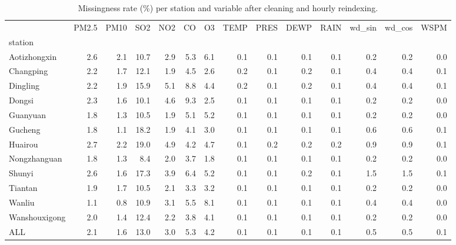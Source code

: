 \begin{table}
\caption{Missingness rate (\%) per station and variable after cleaning and hourly reindexing.}
\label{tab:missingness_station_variable}
\begin{tabular}{lrrrrrrrrrrrrr}
\toprule
 & PM2.5 & PM10 & SO2 & NO2 & CO & O3 & TEMP & PRES & DEWP & RAIN & wd\_sin & wd\_cos & WSPM \\
station &  &  &  &  &  &  &  &  &  &  &  &  &  \\
\midrule
Aotizhongxin & 2.6 & 2.1 & 10.7 & 2.9 & 5.3 & 6.1 & 0.1 & 0.1 & 0.1 & 0.1 & 0.2 & 0.2 & 0.0 \\
Changping & 2.2 & 1.7 & 12.1 & 1.9 & 4.5 & 2.6 & 0.2 & 0.1 & 0.2 & 0.1 & 0.4 & 0.4 & 0.1 \\
Dingling & 2.2 & 1.9 & 15.9 & 5.1 & 8.8 & 4.4 & 0.2 & 0.1 & 0.2 & 0.1 & 0.4 & 0.4 & 0.1 \\
Dongsi & 2.3 & 1.6 & 10.1 & 4.6 & 9.3 & 2.5 & 0.1 & 0.1 & 0.1 & 0.1 & 0.2 & 0.2 & 0.0 \\
Guanyuan & 1.8 & 1.3 & 10.5 & 1.9 & 5.1 & 5.2 & 0.1 & 0.1 & 0.1 & 0.1 & 0.2 & 0.2 & 0.0 \\
Gucheng & 1.8 & 1.1 & 18.2 & 1.9 & 4.1 & 3.0 & 0.1 & 0.1 & 0.1 & 0.1 & 0.6 & 0.6 & 0.1 \\
Huairou & 2.7 & 2.2 & 19.0 & 4.9 & 4.2 & 4.7 & 0.1 & 0.2 & 0.2 & 0.2 & 0.9 & 0.9 & 0.1 \\
Nongzhanguan & 1.8 & 1.3 & 8.4 & 2.0 & 3.7 & 1.8 & 0.1 & 0.1 & 0.1 & 0.1 & 0.2 & 0.2 & 0.0 \\
Shunyi & 2.6 & 1.6 & 17.3 & 3.9 & 6.4 & 5.2 & 0.1 & 0.1 & 0.2 & 0.1 & 1.5 & 1.5 & 0.1 \\
Tiantan & 1.9 & 1.7 & 10.5 & 2.1 & 3.3 & 3.2 & 0.1 & 0.1 & 0.1 & 0.1 & 0.2 & 0.2 & 0.0 \\
Wanliu & 1.1 & 0.8 & 10.9 & 3.1 & 5.5 & 8.1 & 0.1 & 0.1 & 0.1 & 0.1 & 0.4 & 0.4 & 0.0 \\
Wanshouxigong & 2.0 & 1.4 & 12.4 & 2.2 & 3.8 & 4.1 & 0.1 & 0.1 & 0.1 & 0.1 & 0.2 & 0.2 & 0.0 \\
ALL & 2.1 & 1.6 & 13.0 & 3.0 & 5.3 & 4.2 & 0.1 & 0.1 & 0.1 & 0.1 & 0.5 & 0.5 & 0.1 \\
\bottomrule
\end{tabular}
\end{table}
